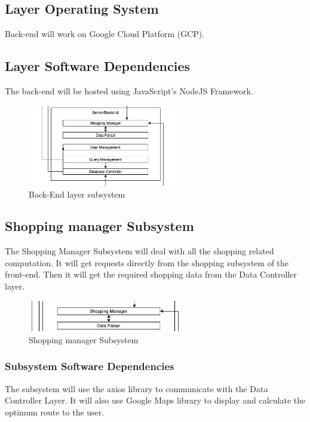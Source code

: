 
\subsection{Layer Operating System}
Back-end will work on Google Cloud Platform (GCP).
\subsection{Layer Software Dependencies}
The back-end will be hosted using JavaScript's NodeJS Framework.
\begin{figure}[h!]
	\centering
 	\includegraphics[width=0.60\textwidth]{images/backend}
 \caption{Back-End layer subsystem}
\end{figure}

\subsection{Shopping manager Subsystem}
The Shopping Manager Subsystem will deal with all the shopping related computation. It will get requests
directly from the shopping subsystem of the front-end. Then it will get the required shopping data
from the Data Controller layer.

\begin{figure}[h!]
	\centering
 	\includegraphics[width=0.60\textwidth]{images/ShoppingManager.png}
 \caption{Shopping manager Subsystem}
\end{figure}


\subsubsection{Subsystem Software Dependencies}
The subsystem will use the axios library to communicate with the Data Controller Layer. It will also use Google Maps library to display and calculate the optimum route to the user.


